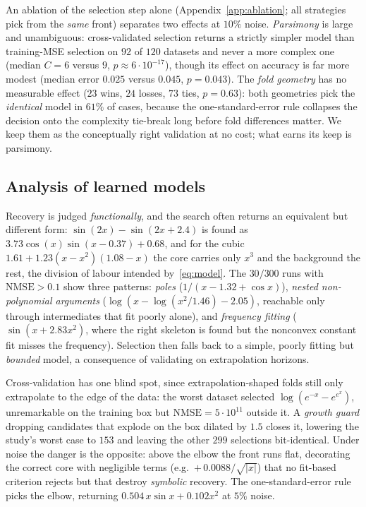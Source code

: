 \documentclass{article}
\newcommand{\nmse}{\mathrm{NMSE}}
\begin{document}
An ablation of the selection step alone (Appendix~\ref{app:ablation}; all
strategies pick from the \emph{same} front) separates two effects at $10\%$
noise. \emph{Parsimony} is large and unambiguous: cross-validated selection
returns a strictly simpler model than training-MSE selection on $92$ of $120$
datasets and never a more complex one (median $C = 6$ versus $9$, $p \approx
6\cdot 10^{-17}$), though its effect on accuracy is far more modest (median
error $0.025$ versus $0.045$, $p = 0.043$). The \emph{fold geometry} has no
measurable effect ($23$ wins, $24$ losses, $73$ ties, $p = 0.63$): both
geometries pick the \emph{identical} model in $61\%$ of cases, because the
one-standard-error rule collapses the decision onto the complexity tie-break
long before fold differences matter. We keep them as the conceptually right
validation at no cost; what earns its keep is parsimony.

\subsection{Analysis of learned models}
\label{sec:analysis}

Recovery is judged \emph{functionally}, and the search often returns an
equivalent but different form: $\sin(2x) - \sin(2x + 2.4)$ is found as
$3.73\cos(x)\sin(x - 0.37) + 0.68$, and for the cubic $1.61 + 1.23(x - x^2)(1.08
- x)$ the core carries only $x^3$ and the background the rest, the division of
labour intended by~\eqref{eq:model}. The $30/300$ runs with $\nmse > 0.1$ show
three patterns: \emph{poles} ($1/(x - 1.32 + \cos x)$), \emph{nested
non-polynomial arguments} ($\log(x - \log(x^2/1.46) - 2.05)$, reachable only
through intermediates that fit poorly alone), and \emph{frequency fitting}
($\sin(x + 2.83x^2)$, where the right skeleton is found but the nonconvex
constant fit misses the frequency). Selection then falls back to a simple,
poorly fitting but \emph{bounded} model, a consequence of validating on
extrapolation horizons.

Cross-validation has one blind spot, since extrapolation-shaped folds still only
extrapolate to the edge of the data: the worst dataset selected $\log(e^{-x} -
e^{e^{x}})$, unremarkable on the training box but $\nmse = 5\cdot 10^{11}$
outside it. A \emph{growth guard} dropping candidates that explode on the box
dilated by $1.5$ closes it, lowering the study's worst case to $153$ and leaving
the other $299$ selections bit-identical. Under noise the danger is the
opposite: above the elbow the front runs flat, decorating the correct core with
negligible terms (e.g.\ $+\,0.0088/\sqrt{|x|}$) that no fit-based criterion
rejects but that destroy \emph{symbolic} recovery. The one-standard-error rule
picks the elbow, returning $0.504\,x\sin x + 0.102x^2$ at $5\%$ noise.
\end{document}
